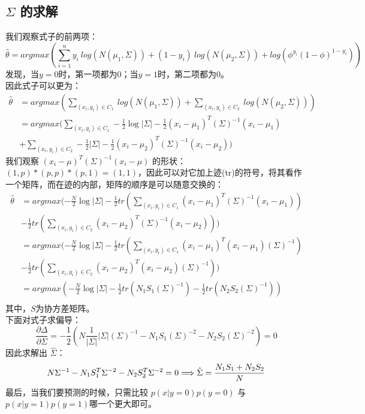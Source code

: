 \documentclass{report}
\begin{document}
\subsection{$\Sigma$ 的求解}
我们观察式子的前两项：
$$
\hat{\theta}=argmax(\sum_{i=1}^n y_i\ log(N(\mu_1,\Sigma))+(1-y_i)\ log(N(\mu_2,\Sigma))+log(\phi^{y_i} (1-\phi)^{1-y_i}))
$$
发现，当$y=0$时，第一项都为$0$；当$y=1$时，第二项都为$0$。\\
因此式子可以更为：
$$
\begin{aligned}
\hat{\theta}
&=argmax(\sum_{(x_i,y_i)\in C_1} \ log(N(\mu_1,\Sigma))+\sum_{(x_i,y_i)\in C_2}\ log(N(\mu_2,\Sigma)))\\
&=argmax(\sum_{(x_i,y_i)\in C_1} -\frac{1}{2}\log|\Sigma|-\frac{1}{2}(x_i-\mu_1)^T(\Sigma)^{-1}(x_i-\mu_1) \\
&+\sum_{(x_i,y_i)\in C_2} -\frac{1}{2}|\Sigma|-\frac{1}{2}(x_i-\mu_2)^T(\Sigma)^{-1}(x_i-\mu_2))
\end{aligned}
$$
我们观察 $(x_i-\mu)^T(\Sigma)^{-1}(x_i-\mu)$ 的形状：$(1,p)* (p,p) * (p,1)=(1,1)$，因此可以对它加上迹(tr)的符号，将其看作一个矩阵，而在迹的内部，矩阵的顺序是可以随意交换的：
$$
\begin{aligned}
\hat{\theta}
&=argmax(-\frac{N}{2}\log|\Sigma|-\frac{1}{2}tr(\sum_{(x_i,y_i)\in C_1}(x_i-\mu_1)^T(\Sigma)^{-1}(x_i-\mu_1))\\
&-\frac{1}{2}tr(\sum_{(x_i,y_i)\in C_2}(x_i-\mu_2)^T(\Sigma)^{-1}(x_i-\mu_2)))\\
&=argmax(-\frac{N}{2}\log|\Sigma|-\frac{1}{2}tr(\sum_{(x_i,y_i)\in C_1}(x_i-\mu_1)^T(x_i-\mu_1)(\Sigma)^{-1})\\
&-\frac{1}{2}tr(\sum_{(x_i,y_i)\in C_2}(x_i-\mu_2)^T(x_i-\mu_2)(\Sigma)^{-1}))\\
&=argmax(-\frac{N}{2}\log|\Sigma|-\frac{1}{2}tr(N_1 S_1(\Sigma)^{-1})
-\frac{1}{2}tr(N_2 S_2(\Sigma)^{-1}))\\
\end{aligned}
$$
其中，$S$为协方差矩阵。\\
下面对式子求偏导：
$$
\frac{\partial \Delta}{\partial \Sigma}=-\frac{1}{2}(N \frac{1}{|\Sigma|}|\Sigma|(\Sigma)^{-1}-N_1S_1(\Sigma)^{-2}-N_2S_2(\Sigma)^{-2})=0
$$
因此求解出 $\hat{\Sigma}$：
$$
N \Sigma^{-1}-N_{1} S_{1}^{T} \Sigma^{-2}-N_{2} S_{2}^{T} \Sigma^{-2}=0\\
\Longrightarrow \hat{\Sigma}=\frac{N_{1} S_{1}+N_{2} S_{2}}{N}
$$
最后，当我们要预测的时候，只需比较 $p(x|y=0)p(y=0)$ 与 $p(x|y=1)p(y=1)$哪一个更大即可。
\newpage
\end{document}
